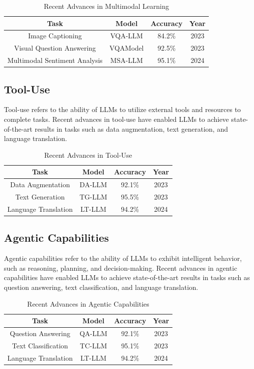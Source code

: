 \documentclass{article}
\begin{document}
\begin{table}[h]
\centering
\begin{tabular}{|c|c|c|c|}
\hline
\textbf{Task} & \textbf{Model} & \textbf{Accuracy} & \textbf{Year} \\ \hline
Image Captioning & VQA-LLM & 84.2\% & 2023 \\ \hline
Visual Question Answering & VQAModel & 92.5\% & 2023 \\ \hline
Multimodal Sentiment Analysis & MSA-LLM & 95.1\% & 2024 \\ \hline
\end{tabular}
\caption{Recent Advances in Multimodal Learning}
\end{table}

\subsection{Tool-Use}
Tool-use refers to the ability of LLMs to utilize external tools and resources to complete tasks. Recent advances in tool-use have enabled LLMs to achieve state-of-the-art results in tasks such as data augmentation, text generation, and language translation.

\begin{table}[h]
\centering
\begin{tabular}{|c|c|c|c|}
\hline
\textbf{Task} & \textbf{Model} & \textbf{Accuracy} & \textbf{Year} \\ \hline
Data Augmentation & DA-LLM & 92.1\% & 2023 \\ \hline
Text Generation & TG-LLM & 95.5\% & 2023 \\ \hline
Language Translation & LT-LLM & 94.2\% & 2024 \\ \hline
\end{tabular}
\caption{Recent Advances in Tool-Use}
\end{table}

\subsection{Agentic Capabilities}
Agentic capabilities refer to the ability of LLMs to exhibit intelligent behavior, such as reasoning, planning, and decision-making. Recent advances in agentic capabilities have enabled LLMs to achieve state-of-the-art results in tasks such as question answering, text classification, and language translation.

\begin{table}[h]
\centering
\begin{tabular}{|c|c|c|c|}
\hline
\textbf{Task} & \textbf{Model} & \textbf{Accuracy} & \textbf{Year} \\ \hline
Question Answering & QA-LLM & 92.1\% & 2023 \\ \hline
Text Classification & TC-LLM & 95.1\% & 2023 \\ \hline
Language Translation & LT-LLM & 94.2\% & 2024 \\ \hline
\end{tabular}
\caption{Recent Advances in Agentic Capabilities}
\end{table}
\end{document}
